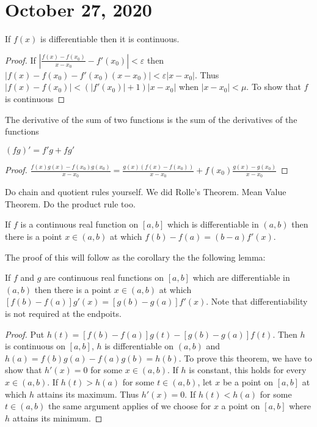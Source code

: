 \documentclass{article}
\newcommand{\eps}{\varepsilon}
\begin{document}
\section{October 27, 2020}
\begin{lemma}
If $f(x)$ is differentiable then it is continuous.
\end{lemma}
\begin{proof}
If $\left|\frac{f(x)-f(x_0)}{x-x_0}-f'(x_0)\right|<\eps$ then $|f(x)-f(x_0)-f'(x_0)(x-x_0)|<\eps |x-x_0|$. Thus $|f(x)-f(x_0)|<(|f'(x_0)|+1)|x-x_0|$ when $|x-x_0|<\mu$. To show that $f$ is continuous
\end{proof}
\begin{proposition}
The derivative of the sum of two functions is the sum of the derivatives of the functions
\end{proposition}
\begin{proposition}
$(fg)'=f'g+fg'$
\end{proposition}
\begin{proof}
$\frac{f(x)g(x)-f(x_0)g(x_0)}{x-x_0}= \frac{g(x)(f(x)-f(x_0))}{x-x_0}+f(x_0)\frac{g(x)-g(x_0)}{x-x_0}$
\end{proof}
Do chain and quotient rules yourself. We did Rolle's Theorem. Mean Value Theorem. Do the product rule too.
\begin{theorem}
If $f$ is a continuous real function on $[a,b]$ which is differentiable in $(a,b)$ then there is a point $x\in(a,b)$ at which $f(b)-f(a)=(b-a)f'(x)$.
\end{theorem}
The proof of this will follow as the corollary the the following lemma:
\begin{lemma}
If $f$ and $g$ are continuous real functions on $[a,b]$ which are differentiable in $(a,b)$ then there is a point $x\in(a,b)$ at which $[f(b)-f(a)]g'(x)=[g(b)-g(a)]f'(x)$. Note that differentiability is not required at the endpoits.
\end{lemma}
\begin{proof}
Put $h(t)=[f(b)-f(a)]g(t)-[g(b)-g(a)]f(t)$. Then $h$ is continuous on $[a,b]$, $h$ is differentiable on $(a,b)$ and $h(a)=f(b)g(a)-f(a)g(b)=h(b)$. To prove this theorem, we have to show that $h'(x)=0$ for some $x\in (a,b)$. If $h$ is constant, this holds for every $x\in(a,b)$. If $h(t)>h(a)$ for some $t\in(a,b)$, let $x$ be a point on $[a,b]$ at which $h$ attains its maximum. Thus $h'(x)=0$. If $h(t)<h(a)$ for some $t\in(a,b)$ the same argument applies of we choose for $x$ a point on $[a,b]$ where $h$ attains its minimum.
\end{proof}
\end{document}
